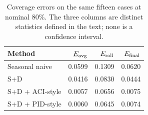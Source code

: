 \begin{table}[htbp]\centering\footnotesize
\caption{Coverage errors on the same fifteen cases at nominal 80\%. The three columns are distinct statistics defined in the text; none is a confidence interval.}
\label{tab:coverage}
\begin{tabular}{lrrr}
\toprule
Method & $E_{\rm avg}$ & $E_{\rm roll}$ & $E_{\rm final}$\\\midrule
Seasonal naive & 0.0599 & 0.1309 & 0.0620\\
S+D & 0.0416 & 0.0830 & 0.0444\\
S+D + ACI-style & 0.0057 & 0.0656 & 0.0075\\
S+D + PID-style & 0.0060 & 0.0645 & 0.0074\\
\bottomrule\end{tabular}\end{table}
